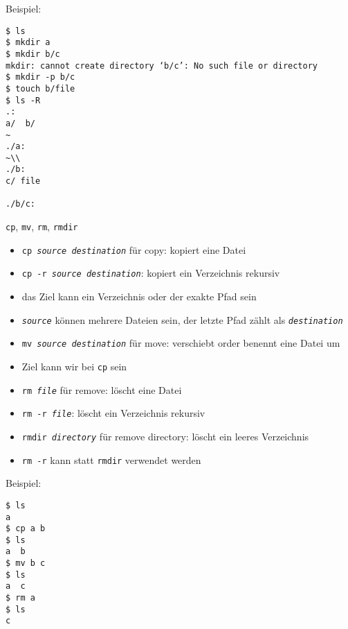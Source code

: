     \begin{frame}[fragile]
      Beispiel:
\begin{verbatim}
$ ls
$ mkdir a
$ mkdir b/c
mkdir: cannot create directory ‘b/c’: No such file or directory
$ mkdir -p b/c
$ touch b/file
$ ls -R
.:
a/  b/
~
./a:
~\\                  
./b:
c/ file

./b/c:
\end{verbatim}
\end{frame}

    \begin{frame}{\texttt{cp}, \texttt{mv}, \texttt{rm}, \texttt{rmdir}}
      \begin{itemize}
        \item \texttt{cp \textit{source} \textit{destination}} für copy: kopiert eine Datei
        \item \texttt{cp -r \textit{source} \textit{destination}}: kopiert ein Verzeichnis rekursiv
        \item das Ziel kann ein Verzeichnis oder der exakte Pfad sein
        \item \texttt{\textit{source}} können mehrere Dateien sein, der letzte Pfad zählt als \texttt{\textit{destination}}
        \item \texttt{mv \textit{source} \textit{destination}} für move: verschiebt order benennt eine Datei um
        \item Ziel kann wir bei \texttt{cp} sein
        \item \texttt{rm \textit{file}} für remove: löscht eine Datei
        \item \texttt{rm -r \textit{file}}: löscht ein Verzeichnis rekursiv
        \item \texttt{rmdir \textit{directory}} für remove directory: löscht ein leeres Verzeichnis
        \item \texttt{rm -r} kann statt \texttt{rmdir} verwendet werden
      \end{itemize}
    \end{frame}

    \begin{frame}[fragile]
      Beispiel:
\begin{verbatim}
$ ls
a
$ cp a b
$ ls
a  b
$ mv b c
$ ls
a  c
$ rm a
$ ls
c
\end{verbatim}
\end{frame}

